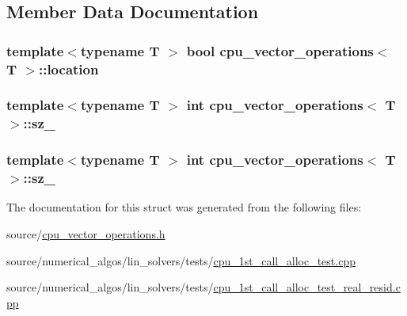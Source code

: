 \subsection{Member Data Documentation}
\hypertarget{structcpu__vector__operations_aa9ffb9a3af966d244e00752d0fbf4954}{
\subsubsection[{location}]{\setlength{\rightskip}{0pt plus 5cm}template$<$typename T $>$ bool {\bf cpu\-\_\-vector\-\_\-operations}$<$ T $>$\-::location}}\label{structcpu__vector__operations_aa9ffb9a3af966d244e00752d0fbf4954}
\hypertarget{structcpu__vector__operations_a2a4bf62b86d243cb5fba381dda5c1e3d}{
\subsubsection[{sz\-\_\-}]{\setlength{\rightskip}{0pt plus 5cm}template$<$typename T $>$ {\bf int} {\bf cpu\-\_\-vector\-\_\-operations}$<$ T $>$\-::sz\-\_\-}}\label{structcpu__vector__operations_a2a4bf62b86d243cb5fba381dda5c1e3d}
\hypertarget{structcpu__vector__operations_a2a4bf62b86d243cb5fba381dda5c1e3d}{
\subsubsection[{sz\-\_\-}]{\setlength{\rightskip}{0pt plus 5cm}template$<$typename T $>$ {\bf int} {\bf cpu\-\_\-vector\-\_\-operations}$<$ T $>$\-::sz\-\_\-}}\label{structcpu__vector__operations_a2a4bf62b86d243cb5fba381dda5c1e3d}


The documentation for this struct was generated from the following files\-:\begin{DoxyCompactItemize}
\item 
source/\hyperlink{cpu__vector__operations_8h}{cpu\-\_\-vector\-\_\-operations.\-h}\item 
source/numerical\-\_\-algos/lin\-\_\-solvers/tests/\hyperlink{cpu__1st__call__alloc__test_8cpp}{cpu\-\_\-1st\-\_\-call\-\_\-alloc\-\_\-test.\-cpp}\item 
source/numerical\-\_\-algos/lin\-\_\-solvers/tests/\hyperlink{cpu__1st__call__alloc__test__real__resid_8cpp}{cpu\-\_\-1st\-\_\-call\-\_\-alloc\-\_\-test\-\_\-real\-\_\-resid.\-cpp}\end{DoxyCompactItemize}
